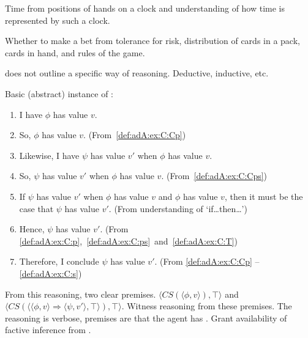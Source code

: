 \begin{note}[\illu{1}]
  Time from positions of hands on a clock and understanding of how time is represented by such a clock.

  Whether to make a bet from tolerance for risk, distribution of cards in a pack, cards in hand, and rules of the game.
\end{note}

\begin{note}
  \adA{} does not outline a specific way of reasoning.
  Deductive, inductive, etc.\
\end{note}

\begin{note}
  Basic (abstract) instance of \adA{}:

  {
    \small
    \begin{enumerate}[label=\arabic*., ref=\arabic*]
    \item\label{def:adA:ex:C:Cp} I have  \(\phi\) has value \(v\).
    \item\label{def:adA:ex:C:p} So, \(\phi\) has value \(v\). \hfill(From~\ref{def:adA:ex:C:Cp})
    \item\label{def:adA:ex:C:Cps} Likewise, I have \csVed{0} \(\psi\) has value \(v'\) when \(\phi\) has value \(v\).
    \item\label{def:adA:ex:C:ps} So, \(\psi\) has value \(v'\) when \(\phi\) has value \(v\). \hfill(From~\ref{def:adA:ex:C:Cps})
    \item\label{def:adA:ex:C:T} If \(\psi\) has value \(v'\) when \(\phi\) has value \(v\) and \(\phi\) has value \(v\), then it must be the case that \(\psi\) has value \(v'\). \hfill (From understanding of `if\dots then\dots')
    \item\label{def:adA:ex:C:s} Hence, \(\psi\) has value \(v'\).\newline
      \mbox{}\hfill (From \ref{def:adA:ex:C:p},~\ref{def:adA:ex:C:ps}~and~\ref{def:adA:ex:C:T})
    \item Therefore, I conclude \(\psi\) has value \(v'\). \hfill (From \ref{def:adA:ex:C:Cp} -- \ref{def:adA:ex:C:s})
    \end{enumerate}
  }
  From this reasoning, two clear premises.
  \(\langle CS(\langle \phi,v \rangle), \top \rangle\) and \(\langle CS(\langle \langle \phi,v \rangle \Rightarrow \langle \psi,v' \rangle, \top \rangle), \top \rangle\).
  Witness reasoning from these premises.
  The reasoning is verbose, premises are that the agent has .
  Grant availability of factive inference from \csVed{0}.


\end{note}
